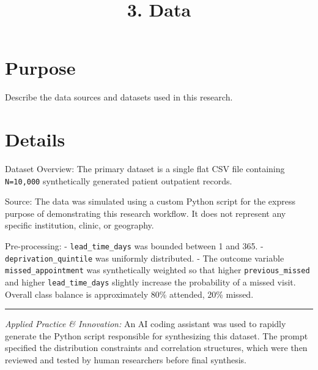 \documentclass[
]{report}
\title{3. Data}
\author{}
\date{}
\renewcommand*\contentsname{Table of contents}
\newcommand\contentsname{Table of contents}
\begin{document}
\maketitle

\renewcommand*\contentsname{Table of contents}
{
\hypersetup{linkcolor=}
\setcounter{tocdepth}{2}
\tableofcontents
}

\chapter{Purpose}\label{purpose}

Describe the data sources and datasets used in this research.

\chapter{Details}\label{details}

Dataset Overview: The primary dataset is a single flat CSV file
containing \texttt{N=10,000} synthetically generated patient outpatient
records.

Source: The data was simulated using a custom Python script for the
express purpose of demonstrating this research workflow. It does not
represent any specific institution, clinic, or geography.

Pre-processing: - \texttt{lead\_time\_days} was bounded between 1 and
365. - \texttt{deprivation\_quintile} was uniformly distributed. - The
outcome variable \texttt{missed\_appointment} was synthetically weighted
so that higher \texttt{previous\_missed} and higher
\texttt{lead\_time\_days} slightly increase the probability of a missed
visit. Overall class balance is approximately 80\% attended, 20\%
missed.

\begin{center}\rule{0.5\linewidth}{0.5pt}\end{center}

\begin{tcolorbox}[enhanced jigsaw, colbacktitle=quarto-callout-note-color!10!white, breakable, title=\textcolor{quarto-callout-note-color}{\faInfo}\hspace{0.5em}{AI Capability Checkpoint}, coltitle=black, arc=.35mm, colback=white, opacitybacktitle=0.6, bottomrule=.15mm, leftrule=.75mm, bottomtitle=1mm, colframe=quarto-callout-note-color-frame, toprule=.15mm, opacityback=0, rightrule=.15mm, toptitle=1mm, left=2mm, titlerule=0mm]

\emph{Applied Practice \& Innovation:} An AI coding assistant was used
to rapidly generate the Python script responsible for synthesizing this
dataset. The prompt specified the distribution constraints and
correlation structures, which were then reviewed and tested by human
researchers before final synthesis.

\end{tcolorbox}
\end{document}
